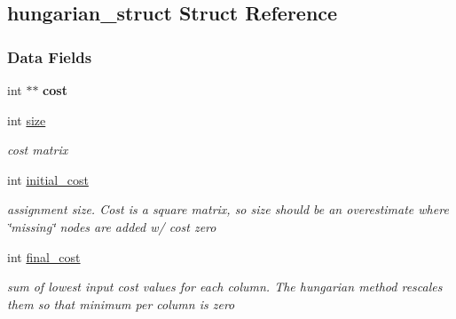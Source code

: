 \hypertarget{structhungarian__struct}{}\subsection{hungarian\+\_\+struct Struct Reference}
\label{structhungarian__struct}
\subsubsection*{Data Fields}
\begin{DoxyCompactItemize}
\item 
\mbox{\label{structhungarian__struct_a035c909caa99385d7de0a3121930ea97}} 
int $\ast$$\ast$ {\bfseries cost}
\item 
\mbox{\label{structhungarian__struct_add5775a6b09229dafbf70064ee507f8a}} 
int \hyperlink{structhungarian__struct_add5775a6b09229dafbf70064ee507f8a}{size}
\begin{DoxyCompactList}\small\item\em cost matrix \end{DoxyCompactList}\item 
\mbox{\label{structhungarian__struct_aac743e34a5477355c52bf0385a1a834a}} 
int \hyperlink{structhungarian__struct_aac743e34a5477355c52bf0385a1a834a}{initial\+\_\+cost}
\begin{DoxyCompactList}\small\item\em assignment size. Cost is a square matrix, so size should be an overestimate where \char`\"{}missing\char`\"{} nodes are added w/ cost zero \end{DoxyCompactList}\item 
\mbox{\label{structhungarian__struct_a585c79fc76d76c173a9b9ad93fb4a3a3}} 
int \hyperlink{structhungarian__struct_a585c79fc76d76c173a9b9ad93fb4a3a3}{final\+\_\+cost}
\begin{DoxyCompactList}\small\item\em sum of lowest input cost values for each column. The hungarian method rescales them so that minimum per column is zero \end{DoxyCompactList}\item 
\mbox{\label{structhungarian__struct_ad1aa7dc6487faaa08c5412aca4443f96}} 
$$
\end{DoxyCompactItemize}
